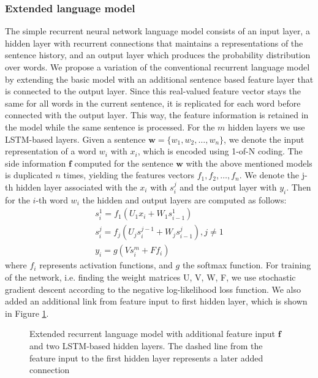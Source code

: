 \documentclass[a4paper]{article}
\begin{document}
\subsubsection{Extended language model}
The simple recurrent neural network language model consists of an input layer, a hidden layer with recurrent connections that maintains a representations of the sentence history, and an output layer which produces the probability distribution over words.
We propose a variation of the conventional recurrent language model by extending the basic model with an additional sentence based feature layer that is connected to the output layer. Since this real-valued feature vector stays the same for all words in the current sentence, it is replicated 
for each word before connected with the output layer. This way, the feature information is retained in the model while the same sentence is processed.
For the $m$ hidden layers we use LSTM-based layers. 
Given a sentence $\textbf{w} = \{w_1, w_2, \ldots, w_n\}$, we denote the input representation of a word $w_i$ with $x_i$, which is encoded using 1-of-N coding. The side information $\textbf{f}$ computed for the sentence $\textbf{w}$ with the above mentioned models is duplicated $n$ times, yielding the features vectors $f_1, f_2, \ldots, f_n$. We denote the j-th hidden layer associated with the  $x_i$ with $s^j_i$ and the output layer with $y_i$. Then for the $i$-th word $w_i$ the hidden and output layers are computed as follows:
\begin{equation}
\begin{aligned}
s^1_i = f_1(U_1x_i + W_1s^1_{i-1}) \\
s^j_i = f_j(U_js^{j-1}_i + W_js^j_{i-1}), j \neq 1 \\
y_i = g(Vs^m_i + Ff_i)
\end{aligned}
\end{equation}
where $f_i$ represents activation functions, and $g$ the softmax function.
For training of the network, i.e. finding the weight matrices U, V, W, F, we use stochastic gradient descent according to the negative log-likelihood loss function. We also added an additional link from feature input to first hidden layer, which is shown in Figure \ref{fig:model-extended}.

\begin{figure} 
\centering 
\def\svgwidth{\columnwidth}

\caption{Extended recurrent language model with additional feature input $\textbf{f}$ and two LSTM-based hidden layers. The dashed line from the feature input to the first hidden layer represents a later added connection}
\label{fig:model-extended}
\end{figure}
\end{document}
